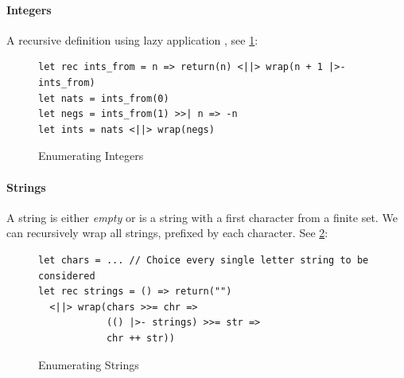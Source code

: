\paragraph{Integers} A recursive definition using lazy application \code{|>-}, see \cref{fig:Integers}:
\begin{figure}[h]
\begin{verbatim}
let rec ints_from = n => return(n) <||> wrap(n + 1 |>- ints_from)
let nats = ints_from(0)
let negs = ints_from(1) >>| n => -n
let ints = nats <||> wrap(negs) 
\end{verbatim}
\begin{subfigure}{0.45\textwidth}
\centering
{}
\caption{}
\end{subfigure}
\begin{subfigure}{0.45\textwidth}
\centering
\scalebox{0.8}{\[\left[\ 0 \quad ; \quad \vcenter{\hbox{\begin{forest}
[$\cdot$ [$1$] [$\cdot$ [$2$] [$\cdot$ [$3$] [...]]]]
\end{forest}}} \quad ; \quad \vcenter{\hbox{\begin{forest}
[$\cdot$ [$-1$] [$\cdot$ [$-2$] [$\cdot$ [$-3$] [...]]]]
\end{forest}}}\right]\]}
\caption{}
\end{subfigure}
\caption{Enumerating Integers}
\label{fig:Integers}
\end{figure}
 
\paragraph{Strings} A string is either \textit{empty} or is a string with a first character from a finite set. We can recursively wrap all strings, prefixed by each character. See \cref{fig:Strings}:
\begin{figure}[h]
\begin{verbatim}
let chars = ... // Choice every single letter string to be considered
let rec strings = () => return("") 
  <||> wrap(chars >>= chr => 
            (() |>- strings) >>= str => 
            chr ++ str)) 
\end{verbatim}
\caption{Enumerating Strings}
\label{fig:Strings}
\end{figure}
\

